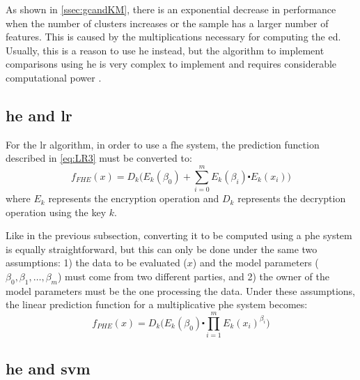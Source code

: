 As shown in \ref{ssec:gcandKM}, there is an exponential decrease in performance when the number of clusters increases or the sample has a larger number of features. This is caused by the multiplications necessary for computing the \ac{ed}. Usually, this is a reason to use \ac{he} instead, but the algorithm to implement comparisons using \ac{he} is very complex to implement and requires considerable computational power \cite{blake2004strong}.




\subsection{\acl{he} and \acl{lr}}
\label{ssec:HEandLR}

For the \ac{lr} algorithm, in order to use a \ac{fhe} system, the prediction function described in \ref{eq:LR3} must be converted to:
\begin{equation}
\label{eq:he_lr1}
f_{FHE}(x) = D_k \Bigg( E_k(\beta_0) + \sum_{i=0}^m E_k(\beta_i) \centerdot E_k(x_i) \Bigg)
\end{equation}
where $E_k$ represents the encryption operation and $D_k$ represents the decryption operation using the key $k$.

Like in the previous subsection, converting it to be computed using a \ac{phe} system is equally straightforward, but this can only be done under the same two assumptions: 1) the data to be evaluated ($x$) and the model parameters ($\beta_0,\beta_1,\ldots,\beta_m$) must come from two different parties, and 2) the owner of the model parameters must be the one processing the data. Under these assumptions, the linear prediction function for a multiplicative \ac{phe} system becomes:
\begin{equation}
\label{eq:he_lr2}
f_{PHE}(x) = D_k \Bigg(E_k(\beta_0) \centerdot \prod_{i=1}^m E_k(x_i)^{\beta_i}         \Bigg)
\end{equation}


\subsection{\acl{he} and \acl{svm}}
\label{ssec:HEandSVM}

